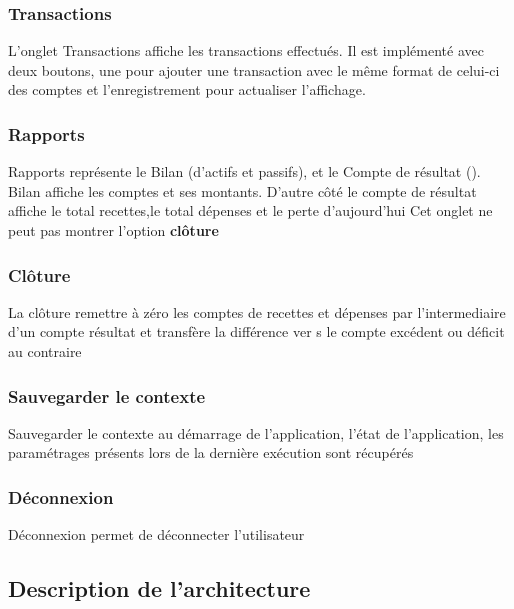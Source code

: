 \documentclass[10pt,a4paper,openany]{report}
\begin{document}
	\subsubsection{Transactions}
	L'onglet Transactions affiche les transactions effectués. Il est implémenté avec deux boutons, une pour ajouter une transaction avec le même format de celui-ci des comptes et l'enregistrement pour actualiser l'affichage.
	
	\subsubsection{Rapports}
	Rapports représente le Bilan (d'actifs et passifs), et le Compte de résultat (). Bilan affiche les comptes et ses montants. D'autre côté le compte de résultat affiche le total recettes,le total dépenses et le perte d'aujourd'hui
	Cet onglet ne peut pas montrer l'option \textbf{clôture}
	
	\subsubsection{Clôture}
	La clôture remettre à zéro les comptes de recettes et dépenses par l'intermediaire d'un compte résultat et transfère la différence ver s le compte excédent ou déficit au contraire
	
	\subsubsection{Sauvegarder le contexte}
	Sauvegarder le contexte au démarrage de l'application, l'état de l'application, les paramétrages présents lors de la dernière exécution sont récupérés
	
	\subsubsection{Déconnexion}
	Déconnexion permet de déconnecter l'utilisateur
	
	
	\subsection{Description de l'architecture}
	
\end{document}
